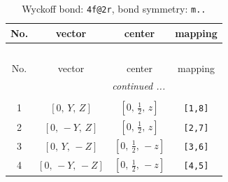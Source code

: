 \documentclass[fleqn,8pt]{jsarticle}
\begin{document}
\renewcommand{\arraystretch}{1.2}
\begin{longtable}{cccc}
\caption{Wyckoff bond: {\tt 4f@2r}, bond symmetry: {\tt m..}}
 \\
 \hline \hline
No. & vector & center & mapping \\ \hline \endfirsthead

\multicolumn{3}{l}{\tablename\ \thetable{}} \\
 \hline \hline
No. & vector & center & mapping \\ \hline \endhead

 \hline \hline
\multicolumn{3}{r}{\footnotesize\it continued ...} \\ \endfoot

 \hline \hline
\multicolumn{3}{r}{} \\ \endlastfoot

1 & $\left[ 0,\, Y,\, Z \right]$ & $\left[ 0,\, \frac{1}{2},\, z \right]$ & {\tt [1,8]} \\ \hline
2 & $\left[ 0,\, - Y,\, Z \right]$ & $\left[ 0,\, \frac{1}{2},\, z \right]$ & {\tt [2,7]} \\ \hline
3 & $\left[ 0,\, Y,\, - Z \right]$ & $\left[ 0,\, \frac{1}{2},\, - z \right]$ & {\tt [3,6]} \\ \hline
4 & $\left[ 0,\, - Y,\, - Z \right]$ & $\left[ 0,\, \frac{1}{2},\, - z \right]$ & {\tt [4,5]} \\
\end{longtable}
\renewcommand{\arraystretch}{1.2}
\end{document}
